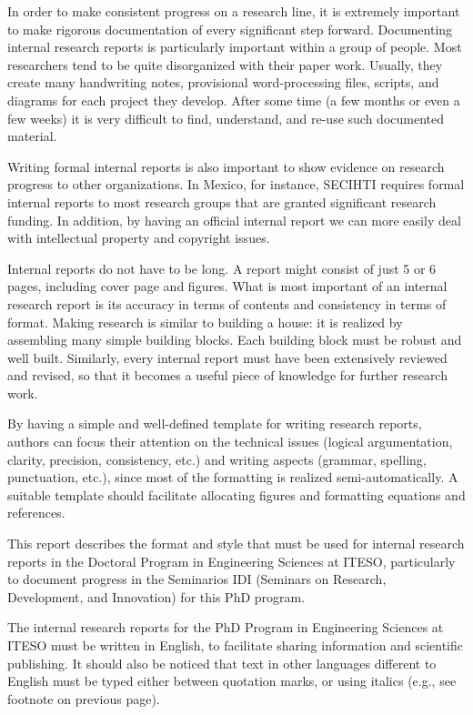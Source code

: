 \documentclass{iteso-irr}
\begin{document}
In order to make consistent progress on a research line, it is extremely
important to make rigorous documentation of every significant step forward.
Documenting internal research reports is particularly important within a
group of people. Most researchers tend to be quite disorganized with their
paper work. Usually, they create many handwriting notes, provisional
word-processing files, scripts, and diagrams for each project they develop.
After some time (a few months or even a few weeks) it is very difficult to
find, understand, and re-use such documented material.

Writing formal internal reports is also important to show evidence on
research progress to other organizations. In Mexico, for instance, SECIHTI
requires formal internal reports to most research groups that are granted
significant research funding. In addition, by having an official internal
report we can more easily deal with intellectual property and copyright
issues.

Internal reports do not have to be long. A report might consist of just 5
or 6 pages, including cover page and figures. What is most important of an
internal research report is its accuracy in terms of contents and
consistency in terms of format. Making research is similar to building a
house: it is realized by assembling many simple building blocks. Each
building block must be robust and well built. Similarly, every internal
report must have been extensively reviewed and revised, so that it becomes a
useful piece of knowledge for further research work.

By having a simple and well-defined template for writing research reports,
authors can focus their attention on the technical issues (logical
argumentation, clarity, precision, consistency, etc.) and writing aspects
(grammar, spelling, punctuation, etc.), since most of the formatting is
realized semi-automatically. A suitable template should facilitate
allocating figures and formatting equations and references.

This report describes the format and style that must be used for internal
research reports in the Doctoral Program in Engineering Sciences at ITESO,
particularly to document progress in the Seminarios IDI (Seminars on
Research, Development, and Innovation) for this PhD program.

The internal research reports for the PhD Program in Engineering Sciences
at ITESO must be written in English, to facilitate sharing information and
scientific publishing. It should also be noticed that text in other
languages different to English must be typed either between quotation marks,
or using italics (e.g., see footnote on previous page).
\end{document}
